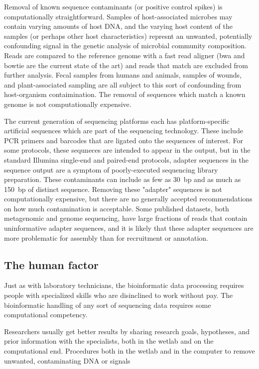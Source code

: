 \documentclass[graybox]{svmult}
\begin{document}
        Removal of known sequence contaminants (or positive control spikes) is computationally straightforward.   Samples of host-associated microbes may contain varying amounts of host DNA, and the varying host content of the samples (or perhaps other host characteristics) represnt an unwanted, potentially confounding signal in the genetic analysis of microbial community composition.  Reads are compared to the reference genome with a fast read aligner (bwa and bowtie are the current state of the art) and reads that match are excluded from further analysis.   Fecal samples from humans and animals, samples of wounds, and plant-associated sampling are all subject to this sort of confounding from host-organism contaimination.  The removal of sequences which match a known genome is not computationally expensive.

        The current generation of sequencing platforms each has platform-specific artificial sequences which are part of the sequencing technology.  These include PCR primers and barcodes that are ligated onto the sequences of interest.
For some protocols, these sequneces are intended to appear in the output, but in the standard Illumina single-end and paired-end protocols, adapter sequences in the sequence output are a symptom of poorly-executed sequencing library preparation.
These contaminants can include as few as 30~bp and as much as 150~bp of distinct sequence.   Removing these "adapter" sequences is not computationally expensive, but there are no generally accepted recommendations on how much contamination is acceptable.
Some published datasets, both metagenomic and genome sequencing, have large fractions of reads that contain uninformative adapter sequences, and it is likely that these adapter sequences are more problematic for assembly than for recruitment or annotation.

\subsection{The human factor}
Just as with laboratory technicians, the bioinformatic data processing requires people with specialized skills who are disinclined to work without pay.  
The bioinformatic handling of any sort of sequencing data requires some computational competency.

Researchers usually get better results by sharing research goals, hypotheses, and prior information with the specialists, both in the wetlab and on the computational end.  Procedures both in the wetlab and in the computer to remove unwanted, contaminating DNA or signals 
\end{document}
